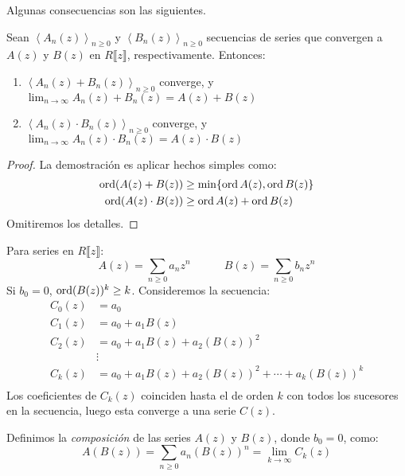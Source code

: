   Algunas consecuencias son las siguientes.
  \begin{theorem}
    \label{theo:series-operaciones}
    Sean \(\left\langle A_n(z) \right\rangle_{n \ge 0}\)
    y \(\left\langle B_n(z) \right\rangle_{n \ge 0}\) secuencias de series
    que convergen a \(A(z)\) y \(B(z)\) en \(R \llbracket z \rrbracket\),
    respectivamente.
    Entonces:
    \begin{enumerate}
    \item
     \(\displaystyle \left\langle A_n(z) + B_n(z) \right\rangle_{n \ge 0}\)
     converge,
     y \(\displaystyle \lim_{n \rightarrow \infty} A_n(z) + B_n(z)
	    = A(z) + B(z)\)
   \item
     \(\displaystyle
	  \left\langle A_n(z) \cdot B_n(z) \right\rangle_{n \ge 0}\)
     converge,
     y \(\displaystyle \lim_{n \rightarrow \infty} A_n(z) \cdot B_n(z)
	    = A(z) \cdot B(z)\)
    \end{enumerate}
  \end{theorem}
  \begin{proof}
    La demostración es aplicar hechos simples como:
    \begin{align*}
      \operatorname{ord} (A(z) + B(z))
	&\ge \min \{ \operatorname{ord} A(z), \operatorname{ord} B(z) \} \\
      \operatorname{ord} (A(z) \cdot B(z))
	&\ge \operatorname{ord} A(z) + \operatorname{ord} B(z)
    \end{align*}
    Omitiremos los detalles.
  \end{proof}

  Para series en \(R \llbracket z \rrbracket\):
  \begin{equation*}
    A(z)
      = \sum_{n \ge 0} a_n z^n
    \hspace{3em}
    B(z)
      = \sum_{n \ge 0} b_n z^n
  \end{equation*}
  Si \(b_0 = 0\),
  \(\operatorname{ord} (B(z))^k \ge k\).
  Consideremos la secuencia:
  \begin{align*}
    C_0(z)
      &= a_0 \\
    C_1(z)
      &= a_0 + a_1 B(z) \\
    C_2(z)
      &= a_0 + a_1 B(z) + a_2 (B(z))^2 \\
      &\vdots \\
    C_k(z)
      &= a_0 + a_1 B(z) + a_2 (B(z))^2 + \dotsb + a_k (B(z))^k \\
  \end{align*}
  Los coeficientes de \(C_k(z)\) coinciden hasta el de orden \(k\)
  con todos los sucesores en la secuencia,
  luego esta converge a una serie \(C(z)\).%
  \begin{definition}
    Definimos la \emph{composición} de las series \(A(z)\) y \(B(z)\),
    donde \(b_0 = 0\),
    como:
    \begin{equation*}
      A(B(z))
	= \sum_{n \ge 0} a_n (B(z))^n
	= \lim_{k \rightarrow \infty} C_k(z)
    \end{equation*}
  \end{definition}

